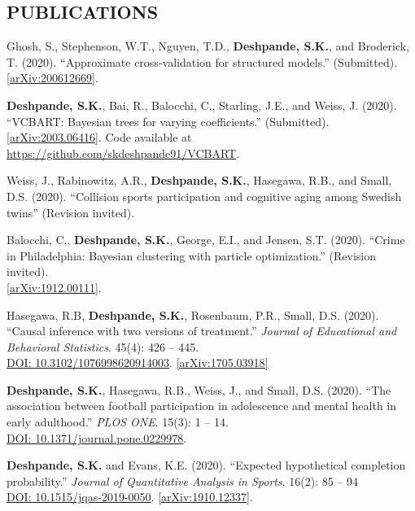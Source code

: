 \documentclass[margin]{res}
\begin{document}
\begin{resume}
\section{PUBLICATIONS}

Ghosh, S., Stephenson, W.T., Nguyen, T.D., \textbf{Deshpande, S.K.}, and Broderick, T. (2020). ``Approximate cross-validation for structured models.'' (Submitted). \\ \href{https://arxiv.org/abs/2006.12669}{[arXiv:200612669]}. 

\textbf{Deshpande, S.K.}, Bai, R., Balocchi, C., Starling, J.E., and Weiss, J. (2020). ``VCBART: Bayesian trees for varying coefficients.'' (Submitted). \\ \href{https://arxiv.org/abs/2003.06416}{[arXiv:2003.06416]}. Code available at \url{https://github.com/skdeshpande91/VCBART}.

Weiss, J., Rabinowitz, A.R., \textbf{Deshpande, S.K.}, Hasegawa, R.B., and Small, D.S. (2020). ``Collision sports participation and cognitive aging among Swedish twins'' (Revision invited).

Balocchi, C., \textbf{Deshpande, S.K.}, George, E.I., and Jensen, S.T. (2020). ``Crime in Philadelphia: Bayesian clustering with particle optimization.'' (Revision invited). \\ \href{https://arxiv.org/abs/1912.00111}{[arXiv:1912.00111]}.

Hasegawa, R.B, \textbf{Deshpande, S.K.}, Rosenbaum, P.R., Small, D.S. (2020). ``Causal inference with two versions of treatment.'' \textit{Journal of Educational and Behavioral Statistics}. 45(4): 426 -- 445.\\ \href{https://doi.org/10.3102/1076998620914003}{DOI: 10.3102/1076998620914003}. \href{https://arxiv.org/abs/1705.03918}{[arXiv:1705.03918]}

\textbf{Deshpande, S.K.}, Hasegawa, R.B., Weiss, J., and Small, D.S. (2020). ``The association between football participation in adolescence and mental health in early adulthood.'' \textit{PLOS ONE}. 15(3): 1 -- 14. \\ \href{https://doi.org/10.1371/journal.pone.0229978}{DOI: 10.1371/journal.pone.0229978}.

\textbf{Deshpande, S.K.} and Evans, K.E. (2020). ``Expected hypothetical completion probability.'' \textit{Journal of Quantitative Analysis in Sports}. 16(2): 85 -- 94 \\ \href{https://doi.org/10.1515/jqas-2019-0050}{DOI: 10.1515/jqas-2019-0050}. \href{https://arxiv.org/abs/1910.12337}{[arXiv:1910.12337]}.


\end{resume}
\end{document}
